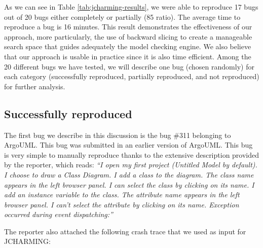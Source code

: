 \documentclass[times]{smrauth}
\begin{document}
As we can see in Table \ref{tab:jcharming-results}, we were able to reproduce 17 bugs
out of 20 bugs either completely or partially (85%
ratio). The average time to reproduce a bug is 16 minutes.
This result demonstrates the effectiveness of our approach,
more particularly, the use of backward slicing to create a
manageable search space that guides adequately the model
checking engine. We also believe that our approach is usable
in practice since it is also time efficient. Among the 20 different bugs we have tested, we will describe
one bug (chosen randomly) for each category (successfully
reproduced, partially reproduced, and not reproduced) for
further analysis.

\subsection{Successfully reproduced}

The first bug we describe in this discussion is the bug \#311
belonging to ArgoUML. This bug was submitted in an earlier
version of ArgoUML. This bug is very simple to manually
reproduce thanks to the extensive description provided by the
reporter, which reads: {\it ``I open my first project (Untitled Model by default). I choose
to draw a Class Diagram. I add a class to the diagram. The
class name appears in the left browser panel. I can select the
class by clicking on its name. I add an instance variable to the
class. The attribute name appears in the left browser panel. I
can't select the attribute by clicking on its name. Exception
occurred during event dispatching:''}

The reporter also attached the following crash trace that we
used as input for JCHARMING:

\vspace*{0.3cm}
\end{document}
